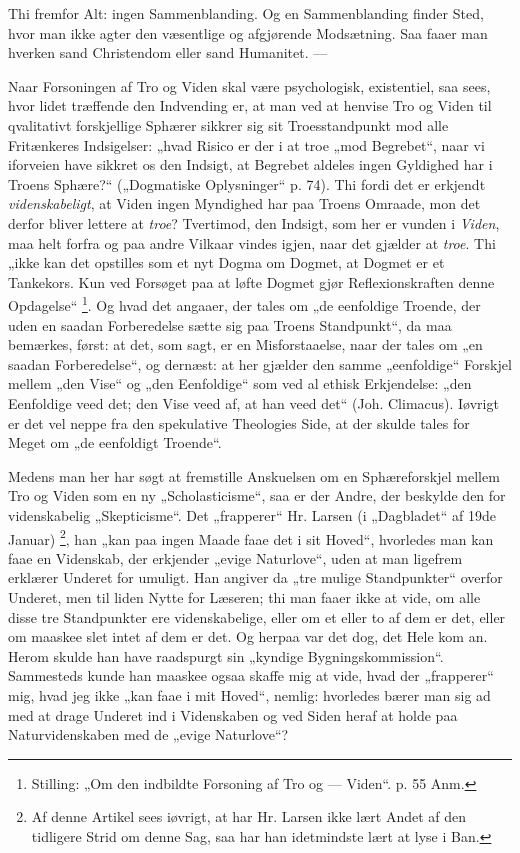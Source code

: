 \documentclass[12pt,a4paper]{book}
\newcommand{\opage}[1]{\marginnote{\footnotesize\textit{[#1]}}}
\begin{document}
Thi fremfor Alt: ingen Sammenblanding. Og en
Sammenblanding finder Sted, hvor man ikke agter den
væsentlige og afgjørende Modsætning. Saa faaer man hverken
sand Christendom eller sand Humanitet. ---

Naar Forsoningen af Tro og Viden skal være psychologisk,
existentiel, saa sees, hvor lidet træffende den Indvending er, at
\opage{44}\setcounter{footnote}{0}%
man ved at henvise Tro og Viden til qvalitativt forskjellige
Sphærer sikkrer sig sit Troesstandpunkt mod alle Fritænkeres
Indsigelser: „hvad Risico er der i at troe „mod Begrebet“,
naar vi iforveien have sikkret os den Indsigt, at Begrebet aldeles
ingen Gyldighed har i Troens Sphære?“ („Dogmatiske
Oplysninger“ p. 74). Thi fordi det er erkjendt \emph{videnskabeligt},
at Viden ingen Myndighed har paa Troens Omraade, mon
det derfor bliver lettere at \emph{troe}? Tvertimod, den Indsigt, som
her er vunden i \emph{Viden}, maa helt forfra og paa andre Vilkaar
vindes igjen, naar det gjælder at \emph{troe}. Thi „ikke kan det
opstilles som et nyt Dogma om Dogmet, at Dogmet er et
Tankekors. Kun ved Forsøget paa at løfte Dogmet gjør
Reflexionskraften denne Opdagelse“%
\footnote{Stilling: „Om den indbildte Forsoning af Tro og --- Viden“.
p. 55 Anm.}. Og hvad det angaaer,
der tales om „de eenfoldige Troende, der uden en saadan
Forberedelse sætte sig paa Troens Standpunkt“, da maa bemærkes,
først: at det, som sagt, er en Misforstaaelse, naar
der tales om „en saadan Forberedelse“, og dernæst: at her
gjælder den samme „eenfoldige“ Forskjel mellem „den Vise“
og „den Eenfoldige“ som ved al ethisk Erkjendelse: „den Eenfoldige
veed det; den Vise veed af, at han veed det“ (Joh.
Climacus). Iøvrigt er det vel neppe fra den spekulative
Theologies Side, at der skulde tales for Meget om „de eenfoldigt
Troende“.

Medens man her har søgt at fremstille Anskuelsen om
en Sphæreforskjel mellem Tro og Viden som en ny „Scholasticisme“,
saa er der Andre, der beskylde den for videnskabelig
„Skepticisme“. Det „frapperer“ Hr. Larsen (i „Dagbladet“
af 19de Januar)%
\footnote{Af denne Artikel sees iøvrigt, at har Hr. Larsen ikke lært Andet af
den tidligere Strid om denne Sag, saa har han idetmindste lært at
lyse i Ban.}, han „kan paa ingen Maade faae det i
sit Hoved“, hvorledes man kan faae en Videnskab, der erkjender
\opage{45}\setcounter{footnote}{0}%
„evige Naturlove“, uden at man ligefrem erklærer Underet for
umuligt. Han angiver da „tre mulige Standpunkter“ overfor
Underet, men til liden Nytte for Læseren; thi man faaer ikke
at vide, om alle disse tre Standpunkter ere videnskabelige, eller
om et eller to af dem er det, eller om maaskee slet intet af
dem er det. Og herpaa var det dog, det Hele kom an. Herom
skulde han have raadspurgt sin „kyndige Bygningskommission“.
Sammesteds kunde han maaskee ogsaa skaffe mig at vide, hvad
der „frapperer“ mig, hvad jeg ikke „kan faae i mit Hoved“,
nemlig: hvorledes bærer man sig ad med at drage Underet
ind i Videnskaben og ved Siden heraf at holde paa Naturvidenskaben
med de „evige Naturlove“?
\end{document}
